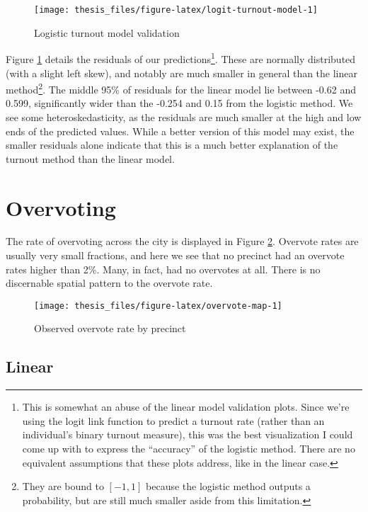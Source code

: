 \documentclass[12pt,twoside]{reedthesis}
\begin{document}
\begin{figure}
\texttt{[image: thesis\_files/figure-latex/logit-turnout-model-1]} \caption{Logistic turnout model validation}\label{fig:logit-turnout-model}
\end{figure}
Figure \ref{fig:logit-turnout-model} details the residuals of our predictions\footnote{This is somewhat an abuse of the linear model validation plots. Since we're using the logit link function to predict a turnout rate (rather than an individual's binary turnout measure), this was the best visualization I could come up with to express the ``accuracy'' of the logistic method. There are no equivalent assumptions that these plots address, like in the linear case.}. These are normally distributed (with a slight left skew), and notably are much smaller in general than the linear method\footnote{They are bound to \([-1,1]\) because the logistic method outputs a probability, but are still much smaller aside from this limitation.}. The middle 95\% of residuals for the linear model lie between -0.62 and 0.599, significantly wider than the -0.254 and 0.15 from the logistic method. We see some heteroskedasticity, as the residuals are much smaller at the high and low ends of the predicted values. While a better version of this model may exist, the smaller residuals alone indicate that this is a much better explanation of the turnout method than the linear model.

\hypertarget{overvoting}{%
\section{Overvoting}\label{overvoting}}

The rate of overvoting across the city is displayed in Figure \ref{fig:overvote-map}. Overvote rates are usually very small fractions, and here we see that no precinct had an overvote rates higher than 2\%. Many, in fact, had no overvotes at all. There is no discernable spatial pattern to the overvote rate.
\begin{figure}
\texttt{[image: thesis\_files/figure-latex/overvote-map-1]} \caption{Observed overvote rate by precinct}\label{fig:overvote-map}
\end{figure}
\hypertarget{linear-1}{%
\subsection{Linear}\label{linear-1}}
\end{document}
